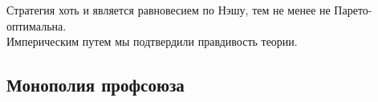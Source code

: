  Стратегия хоть и является равновесием по Нэшу, тем не менее не Парето-оптимальна.\\
 
 
 	
Империческим путем мы подтвердили правдивость теории. 


\subsection{Монополия профсоюза}

